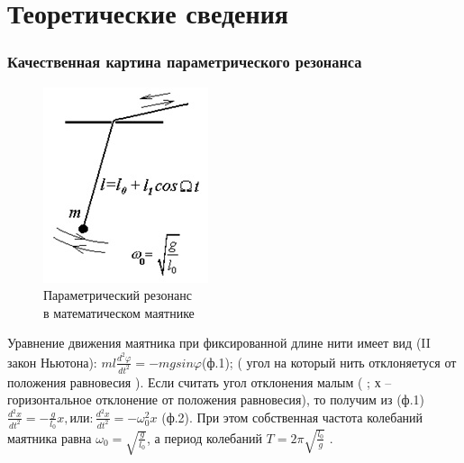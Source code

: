 \documentclass[a4paper,12pt]{article}
\begin{document}
\section*{Теоретические сведения}

\subsubsection*{Качественная картина параметрического резонанса}
	
\begin{figure} 
	\includegraphics[width=\linewidth]{fig1}
	\caption{Параметрический резонанс \\ в математическом маятнике}				
\end{figure}

Уравнение движения маятника при фиксированной длине нити имеет вид (II закон Ньютона): $ml\frac{d^2\varphi}{dt^2}=-mgsin{\varphi}$(ф.1); ( угол на который нить отклоняетуся от положения равновесия ).  Если считать угол отклонения малым ( ;   х – горизонтальное отклонение от положения равновесия), то  получим из (ф.1)$ \frac{d^2x}{dt^2}=-\frac{g}{l_0}x, или: \frac{d^2x}{dt^2}=-\omega_0^2x$ (ф.2). При этом собственная частота колебаний маятника равна $\omega_0=\sqrt{\frac{g}{l_0}}$, а период колебаний $T=2\pi\sqrt{\frac{l_0}{g}}$ .
\end{document}
